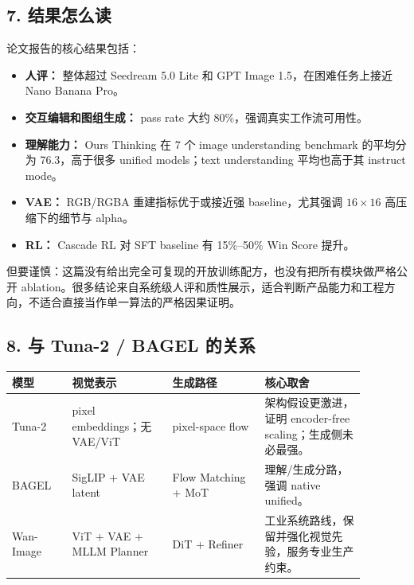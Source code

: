 \subsection{7. 结果怎么读}

论文报告的核心结果包括：

\begin{itemize}[leftmargin=1.5em]
  \item \textbf{人评：} 整体超过 Seedream 5.0 Lite 和 GPT Image 1.5，在困难任务上接近 Nano Banana Pro。
  \item \textbf{交互编辑和图组生成：} pass rate 大约 80\%，强调真实工作流可用性。
  \item \textbf{理解能力：} Ours Thinking 在 7 个 image understanding benchmark 的平均分为 76.3，高于很多 unified models；text understanding 平均也高于其 instruct mode。
  \item \textbf{VAE：} RGB/RGBA 重建指标优于或接近强 baseline，尤其强调 \(16\times16\) 高压缩下的细节与 alpha。
  \item \textbf{RL：} Cascade RL 对 SFT baseline 有 15\%--50\% Win Score 提升。
\end{itemize}

但要谨慎：这篇没有给出完全可复现的开放训练配方，也没有把所有模块做严格公开 ablation。很多结论来自系统级人评和质性展示，适合判断产品能力和工程方向，不适合直接当作单一算法的严格因果证明。

\subsection{8. 与 Tuna-2 / BAGEL 的关系}

\begin{center}
\footnotesize
\setlength{\tabcolsep}{3pt}
\begin{tabular}{p{0.15\linewidth} p{0.25\linewidth} p{0.23\linewidth} p{0.25\linewidth}}
\toprule
\textbf{模型} & \textbf{视觉表示} & \textbf{生成路径} & \textbf{核心取舍}\\
\midrule
Tuna-2 & pixel embeddings；无 VAE/ViT & pixel-space flow & 架构假设更激进，证明 encoder-free scaling；生成侧未必最强。\\
BAGEL & SigLIP + VAE latent & Flow Matching + MoT & 理解/生成分路，强调 native unified。\\
Wan-Image & ViT + VAE + MLLM Planner & DiT + Refiner & 工业系统路线，保留并强化视觉先验，服务专业生产约束。\\
\bottomrule
\end{tabular}
\end{center}

